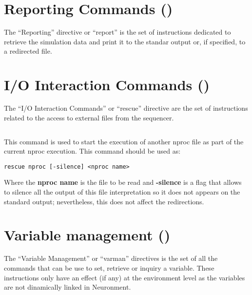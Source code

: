 %
%

\section{Reporting Commands ()}
The ``Reporting'' directive or ``report'' is the set of instructions dedicated to retrieve the simulation data and print it to the standar output or, if specified, to a redirected file.

\subsection{ }

\section{I/O Interaction Commands ()}
The ``I/O Interaction Commands'' or ``rescue'' directive are the set of instructions related to the access to external files from the sequencer.

\subsection{ }
This command is used to start the execution of another nproc file as part of the current nproc execution. This command should be used as:
\begin{verbatim}
rescue nproc [-silence] <nproc name>
\end{verbatim}
Where the \textbf{nproc name} is the file to be read and \textbf{-silence} is a flag that allows to silence all the output of this file interpretation so it does not appears on the standard output; nevertheless, this does not affect the redirections.

\subsection{ }

\section{Variable management ()}
The ``Variable Management'' or ``varman'' directives is the set of all the commands that can be use to set, retrieve or inquiry a variable. These instructions only have an effect (if any) at the environment level as the variables are not dinamically linked in Neuronment.

